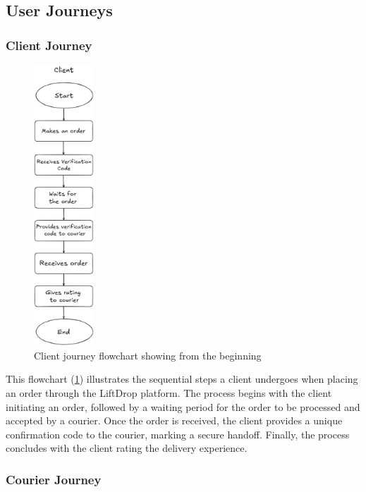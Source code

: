 \subsection{User Journeys}

\subsubsection{Client Journey}

\bigskip

\begin{figure}[H]
    \centering
    \includegraphics[width=0.2\textwidth]{images/ClientJourney.png} %
    \caption{Client journey flowchart showing from the beginning}
    \label{fig:client_journey}
\end{figure}

This flowchart (\ref{fig:client_journey}) illustrates the sequential steps a client undergoes when placing an order through the LiftDrop platform. The process begins with the client initiating an order, followed by a waiting period for the order to be processed and accepted by a courier. Once the order is received, the client provides a unique confirmation code to the courier, marking a secure handoff. Finally, the process concludes with the client rating the delivery experience.

\newpage

\subsubsection{Courier Journey}

